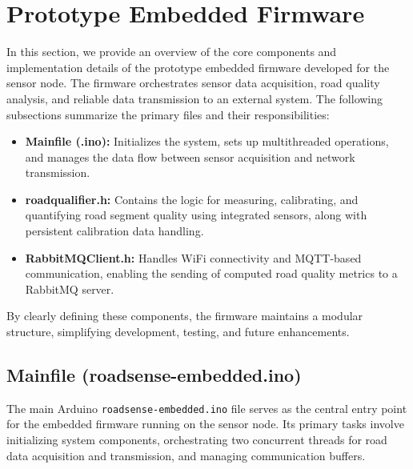 \section{Prototype Embedded Firmware}

In this section, we provide an overview of the core components and implementation details of the prototype embedded firmware developed for the sensor node. The firmware orchestrates sensor data acquisition, road quality analysis, and reliable data transmission to an external system.
The following subsections summarize the primary files and their responsibilities:

\begin{itemize}
    \item \textbf{Mainfile (.ino):} Initializes the system, sets up multithreaded operations, and manages the data flow between sensor acquisition and network transmission.
    \item \textbf{roadqualifier.h:} Contains the logic for measuring, calibrating, and quantifying road segment quality using integrated sensors, along with persistent calibration data handling.
    \item \textbf{RabbitMQClient.h:} Handles WiFi connectivity and MQTT-based communication, enabling the sending of computed road quality metrics to a RabbitMQ server.
\end{itemize}

By clearly defining these components, the firmware maintains a modular structure, simplifying development, testing, and future enhancements.

\subsection{Mainfile (roadsense-embedded.ino)}

The main Arduino \texttt{roadsense-embedded.ino} file serves as the central entry point for the embedded firmware running on the sensor node. Its primary tasks involve initializing system components, orchestrating two concurrent threads for road data acquisition and transmission, and managing communication buffers.

